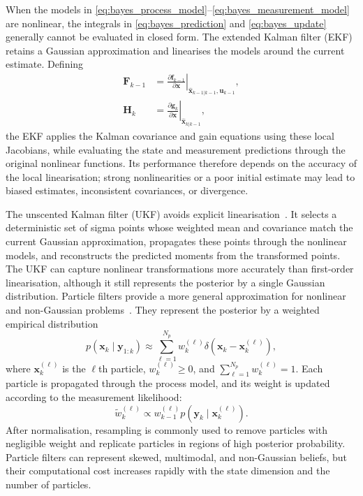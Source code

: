 \documentclass[11pt,oneside,openany]{book}
\begin{document}
When the models in \eqref{eq:bayes_process_model}--\eqref{eq:bayes_measurement_model} are nonlinear, the integrals in \eqref{eq:bayes_prediction} and
\eqref{eq:bayes_update} generally cannot be evaluated in closed form.
The extended Kalman filter (EKF) retains a Gaussian approximation and
linearises the models around the current estimate. Defining
\begin{subequations}
\begin{align}
\mathbf{F}_{k-1}
&=
\left.
\frac{\partial\mathbf{f}_{k-1}}
{\partial\mathbf{x}}
\right|_{\widehat{\mathbf{x}}_{k-1|k-1},
\mathbf{u}_{k-1}},
\\
\mathbf{H}_k
&=
\left.
\frac{\partial\mathbf{g}_k}
{\partial\mathbf{x}}
\right|_{\widehat{\mathbf{x}}_{k|k-1}},
\end{align}
\end{subequations}
the EKF applies the Kalman covariance and gain equations using these
local Jacobians, while evaluating the state and measurement predictions
through the original nonlinear functions. Its performance therefore
depends on the accuracy of the local linearisation; strong
nonlinearities or a poor initial estimate may lead to biased estimates,
inconsistent covariances, or divergence.

The unscented Kalman filter (UKF) avoids explicit
linearisation~\cite{julier2004_ukf}. It selects a deterministic set of
sigma points whose weighted mean and covariance match the current
Gaussian approximation, propagates these points through the nonlinear
models, and reconstructs the predicted moments from the transformed
points. The UKF can capture nonlinear transformations more accurately
than first-order linearisation, although it still represents the
posterior by a single Gaussian distribution. Particle filters provide a more general approximation for nonlinear and non-Gaussian problems~\cite{gordon1993_pf,arulampalam2002_pf_tutorial}. They represent the posterior by a weighted empirical distribution
\begin{equation}
p(\mathbf{x}_k\mid\mathbf{y}_{1:k})
\approx
\sum_{\ell=1}^{N_p}
w_k^{(\ell)}
\delta\!\left(
\mathbf{x}_k-\mathbf{x}_k^{(\ell)}
\right),
\label{eq:particle_posterior}
\end{equation}
where $\mathbf{x}_k^{(\ell)}$ is the $\ell$th particle,
$w_k^{(\ell)}\geq 0$, and
$\sum_{\ell=1}^{N_p}w_k^{(\ell)}=1$. Each particle is propagated
through the process model, and its weight is updated according to the
measurement likelihood:
\begin{equation}
\widetilde{w}_k^{(\ell)}
\propto
w_{k-1}^{(\ell)}
p\!\left(
\mathbf{y}_k\mid\mathbf{x}_k^{(\ell)}
\right).
\end{equation}
After normalisation, resampling is commonly used to remove particles
with negligible weight and replicate particles in regions of high
posterior probability. Particle filters can represent skewed,
multimodal, and non-Gaussian beliefs, but their computational cost
increases rapidly with the state dimension and the number of particles.
\end{document}
